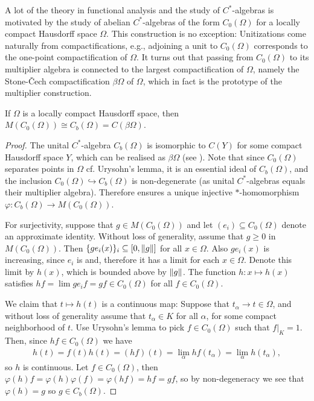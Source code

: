 A lot of the theory in functional analysis and the study of $C^*$-algebras is motivated by the study of abelian $C^*$-algebras of the form $C_0(\Omega)$ for a locally compact Hausdorff space $\Omega$. This construction is no exception: Unitizations come naturally from compactifications, e.g., adjoining a unit to $C_0(\Omega)$ corresponds to the one-point compactification of $\Omega$. It turns out that passing from $C_0(\Omega)$ to its multiplier algebra is connected to the largest compactification of $\Omega$, namely the Stone-\v{C}ech compactification $\beta \Omega$ of $\Omega$, which in fact is the prototype of the multiplier construction.
\begin{example}
If $\Omega$ is a locally compact Hausdorff space, then $M(C_0(\Omega))\cong C_b(\Omega) = C(\beta \Omega)$.
\end{example}
\begin{proof}
	The unital $C^*$-algebra $C_b(\Omega)$ is isomorphic to $C(Y)$ for some compact Hausdorff space $Y$, which can be realised as $\beta \Omega$ (see \cite[151]{annow}). Note that since $C_0(\Omega)$ separates points in $\Omega$ cf. Urysohn's lemma, it is an essential ideal of $C_b(\Omega)$, and the inclusion $C_0(\Omega) \hookrightarrow C_b(\Omega)$ is non-degenerate (as unital $C^*$-algebras equals their multiplier algebra). Therefore  ensures a unique injective $*$-homomorphism $\varphi \colon C_b(\Omega) \to M(C_0(\Omega))$. 

	For surjectivity, suppose that $g \in M(C_0(\Omega))$ and let $(e_i) \subseteq C_0(\Omega)$ denote an approximate identity. Without loss of generality, assume that $g \geq 0$ in $M(C_0(\Omega))$. Then $\{ge_i(x)\}_i \subseteq [0,\left\lVert g \right\rVert]$ for all $x \in \Omega$. Also $ge_i(x)$ is increasing, since $e_i$ is and, therefore it has a limit for each $x \in \Omega$. Denote this limit by $h(x)$, which is bounded above by $\left\lVert g \right\rVert$. The function $h \colon x \mapsto h(x)$ satisfies $hf = \lim ge_if =  gf \in C_0(\Omega)$ for all $f \in C_0(\Omega)$.

	We claim that $t \mapsto h(t)$ is a continuous map: Suppose that $t_\alpha \to t \in \Omega$, and without loss of generality assume that $t_\alpha \in K$ for all $\alpha$, for some compact neighborhood of $t$. Use Urysohn's lemma to pick $f \in C_0(\Omega)$ such that $f\big|_K = 1$. Then, since $h f \in C_0(\Omega)$ we have
	\begin{align*}
		h(t)=f(t) h(t) = (hf)(t) = \lim_{\alpha} hf(t_\alpha) = \lim_{\alpha}h(t_\alpha),
	\end{align*}
	so $h$ is continuous. Let $f \in C_0(\Omega)$, then $\varphi(h) f  = \varphi(h) \varphi(f) = \varphi(hf) =  hf = gf$, so by non-degeneracy we see that $\varphi(h) = g$ so $g \in C_b(\Omega)$.
\end{proof}

